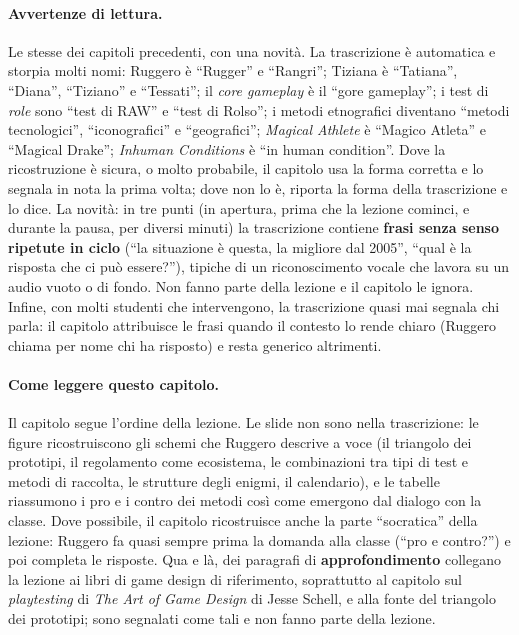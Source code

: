 \paragraph{Avvertenze di lettura.} Le stesse dei capitoli precedenti, con una novità. La
trascrizione è automatica e storpia molti nomi: Ruggero è ``Rugger'' e ``Rangri'';
Tiziana è ``Tatiana'', ``Diana'', ``Tiziano'' e ``Tessati''; il \emph{core gameplay} è
il ``gore gameplay''; i test di \emph{role} sono ``test di RAW'' e ``test di Rolso''; i
metodi etnografici diventano ``metodi tecnologici'', ``iconografici'' e ``geografici'';
\emph{Magical Athlete} è ``Magico Atleta'' e ``Magical Drake''; \emph{Inhuman
Conditions} è ``in human condition''. Dove la ricostruzione è sicura, o molto probabile,
il capitolo usa la forma corretta e lo segnala in nota la prima volta; dove non lo è,
riporta la forma della trascrizione e lo dice. La novità: in tre punti (in apertura,
prima che la lezione cominci, e durante la pausa, per diversi minuti) la trascrizione
contiene \textbf{frasi senza senso ripetute in ciclo} (``la situazione è questa, la
migliore dal 2005'', ``qual è la risposta che ci può essere?''), tipiche di un
riconoscimento vocale che lavora su un audio vuoto o di fondo. Non fanno parte della
lezione e il capitolo le ignora. Infine, con molti studenti che intervengono, la
trascrizione quasi mai segnala chi parla: il capitolo attribuisce le frasi quando il
contesto lo rende chiaro (Ruggero chiama per nome chi ha risposto) e resta generico
altrimenti.

\paragraph{Come leggere questo capitolo.} Il capitolo segue l'ordine della lezione. Le
slide non sono nella trascrizione: le figure ricostruiscono gli schemi che Ruggero
descrive a voce (il triangolo dei prototipi, il regolamento come ecosistema, le
combinazioni tra tipi di test e metodi di raccolta, le strutture degli enigmi, il
calendario), e le tabelle riassumono i pro e i contro dei metodi così come emergono
dal dialogo con la classe. Dove possibile, il capitolo ricostruisce anche la parte
``socratica'' della lezione: Ruggero fa quasi sempre prima la domanda alla classe (``pro
e contro?'') e poi completa le risposte. Qua e là, dei paragrafi di
\textbf{approfondimento} collegano la lezione ai libri di game design di riferimento,
soprattutto al capitolo sul \emph{playtesting} di \emph{The Art of Game Design} di Jesse
Schell, e alla fonte del triangolo dei prototipi; sono segnalati come tali e non fanno
parte della lezione.

